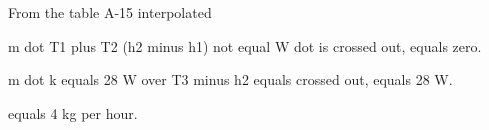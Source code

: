 From the table A-15 interpolated

m dot T1 plus T2 (h2 minus h1) not equal W dot is crossed out, equals zero.

m dot k equals 28 W over T3 minus h2 equals crossed out, equals 28 W.

equals 4 kg per hour.